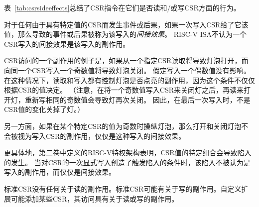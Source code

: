 表~\ref{tab:csrsideeffects}总结了CSR指令在它们是否读和/或写CSR方面的行为。

对于任何由于具有特定值的CSR而发生事件或后果，如果一次写入CSR给了它该值，那么导致的事件或后果被称为该写入的\emph{间接效果}。
RISC-V ISA不认为一个CSR写入的间接效果是该写入的副作用。

\begin{commentary}
  CSR访问的一个副作用的例子是，如果从一个指定CSR读取将导致灯泡打开，而向同一个CSR写入一个奇数值将导致灯泡关闭。
  假定写入一个偶数值没有影响。在这种情况下，读取和写入都有控制灯泡是否点亮的副作用，因为这个条件不仅仅根据CSR的值决定。
  （注意，在将一个奇数值写入CSR来关闭灯之后，再读来打开灯，重新写相同的奇数值会导致灯再次关闭。
  因此，在最后一次写入时，不是CSR值的变化关掉了灯。）

  另一方面，如果在某个特定CSR的值为奇数时操纵灯泡，那么打开和关闭灯泡不会被视为写入CSR的副作用，仅仅是这种写入的间接效果。

  更具体地，第二卷中定义的RISC-V特权架构表明，CSR值的特定组合会导致陷入的发生。
  当对CSR的一次显式写入创造了触发陷入的条件时，该陷入不被认为是写入的副作用，而仅仅是间接效果。

  标准CSR没有任何关于读的副作用。标准CSR可能有关于写的副作用。自定义扩展可能添加某些CSR，其访问具有关于读或写的副作用。
\end{commentary}

